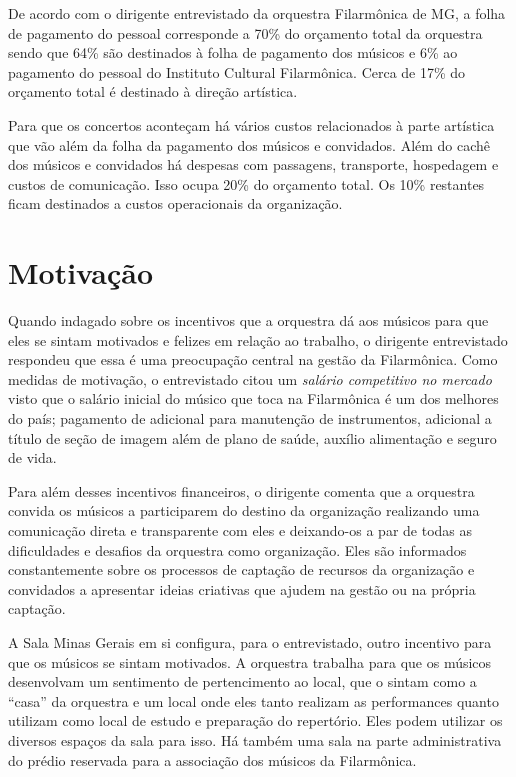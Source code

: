 \documentclass[a4paper, 12pt, openright, oneside, german, french, english, brazil]{abntex2}
\begin{document}
	De acordo com o dirigente entrevistado da orquestra Filarmônica de MG, a folha de pagamento do pessoal corresponde a 70\% do orçamento total da orquestra sendo que 64\% são destinados à folha de pagamento dos músicos e 6\% ao pagamento do pessoal do Instituto Cultural Filarmônica. Cerca de 17\% do orçamento total é destinado à direção artística.
	
	Para que os concertos aconteçam há vários custos relacionados à parte artística que vão além da folha da pagamento dos músicos e convidados. Além do cachê dos músicos e convidados há despesas com passagens, transporte, hospedagem e custos de comunicação. Isso ocupa 20\% do orçamento total. Os 10\% restantes ficam destinados a custos operacionais da organização.
	
	\section{Motivação}
	
	Quando indagado sobre os incentivos que a orquestra dá aos músicos para que eles se sintam motivados e felizes em relação ao trabalho, o dirigente entrevistado respondeu que essa é uma preocupação central na gestão da Filarmônica. Como medidas de motivação, o entrevistado citou um \textit{salário competitivo no mercado} visto que o salário inicial do músico que toca na Filarmônica é um dos melhores do país; pagamento de adicional para manutenção de instrumentos, adicional a título de seção de imagem além de plano de saúde, auxílio alimentação e seguro de vida.
	
	Para além desses incentivos financeiros, o dirigente comenta que a orquestra convida os músicos a participarem do destino da organização realizando uma comunicação direta e transparente com eles e deixando-os a par de todas as dificuldades e desafios da orquestra como organização. Eles são informados constantemente sobre os processos de captação de recursos da organização e convidados a apresentar ideias criativas que ajudem na gestão ou na própria captação.
	
	A Sala Minas Gerais em si configura, para o entrevistado, outro incentivo para que os músicos se sintam motivados. A orquestra trabalha para que os músicos desenvolvam um sentimento de pertencimento ao local, que o sintam como a ``casa'' da orquestra e um local onde eles tanto realizam as performances quanto utilizam como local de estudo e preparação do repertório. Eles podem utilizar os diversos espaços da sala para isso. Há também uma sala na parte administrativa do prédio reservada para a associação dos músicos da Filarmônica.
	
\end{document}

